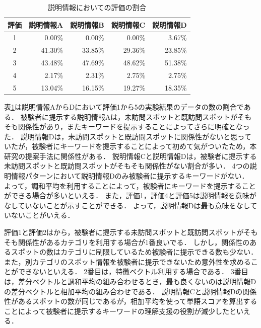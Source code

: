 \documentclass{deimj}
\begin{document}
\begin{table}[t]
  \caption{説明情報においての評価の割合}
  \label{table:説明情報においての評価の割合}
  \centering
  \begin{tabular}{c|r|r|r|r}
  \hline
  評価 & \multicolumn{1}{c|}{説明情報A} & \multicolumn{1}{c|}{説明情報B} & \multicolumn{1}{c|}{説明情報C} & \multicolumn{1}{c}{説明情報D} \\ \hline
  1  & 0.00\%                     & 0.00\%                     & 0.00\%                     & 3.67\%                    \\
  2  & 41.30\%                    & 33.85\%                    & 29.36\%                    & 23.85\%                   \\
  3  & 43.48\%                    & 47.69\%                    & 48.62\%                    & 51.38\%                   \\
  4  & 2.17\%                     & 2.31\%                     & 2.75\%                     & 2.75\%                    \\
  5  & 13.04\%                    & 16.15\%                    & 19.27\%                    & 18.35\%                   \\ \hline
  \end{tabular}
\end{table}

表\ref{table:説明情報においての評価の割合}は説明情報AからDにおいて評価1から5の実験結果のデータの数の割合である．
被験者に提示する説明情報Aは，未訪問スポットと既訪問スポットがそもそも関係性があり，またキーワードを提示することによってさらに明確となった．
説明情報Dは，未訪問スポットと既訪問スポットに関係性がないと思っていたが，被験者にキーワードを提示することによって初めて気がついたため，本研究の提案手法に関係性がある．
説明情報Cと説明情報Dは，被験者に提示する未訪問スポットと既訪問スポットがそもそも関係性がない割合が多い．
4つの説明情報パターンにおいて説明情報Dのみ被験者に提示するキーワードがない．
よって，調和平均を利用することによって，被験者にキーワードを提示することができる場合が多いといえる．
また，評価1，評価4と評価5は説明情報を意味がなしていないことが示すことができる．
よって，説明情報Dは最も意味をなしていないことがいえる．

評価1と評価2はから，被験者に提示する未訪問スポットと既訪問スポットがそもそも関係性があるカテゴリを利用する場合が1番良いでる．
しかし，関係性のあるスポットの数はカテゴリに制限しているため被験者に提示できる数も少ない．
また，別カテゴリのスポット情報を被験者に提示できないため意外性を求めることができないといえる．
2番目は，特徴ベクトル利用する場合である．
3番目は，差分ベクトルと調和平均の組み合わせるとき，最も良くないのは説明情報Dの差分ベクトルと相加平均の組み合わせである．
説明情報Cと説明情報Dの関係性があるスポットの数が同じであるが，相加平均を使って単語スコアを算出することによって被験者に提示するキーワードの理解支援の役割が減少したといえる．
\end{document}
